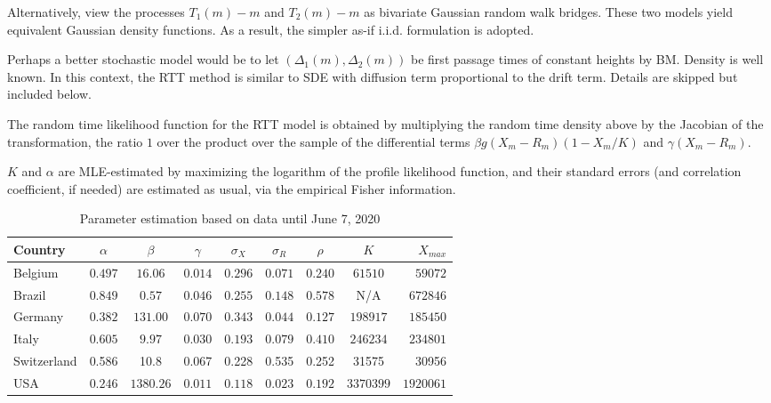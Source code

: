 \documentclass{article}
\begin{document}
\noindent Alternatively, view the processes $T_1(m)-m$ and $T_2(m)-m$ as bivariate Gaussian random walk bridges.
These two models yield equivalent Gaussian density functions. As a result, the simpler as-if i.i.d. formulation is adopted.

\bigskip

\noindent Perhaps a better stochastic model would be to let $(\Delta_1(m),\Delta_2(m))$ be first passage times of constant heights by BM. Density is well known. In this context, the RTT method is similar to SDE with diffusion term proportional to the drift term. Details are skipped but included below.

\bigskip

\noindent The random time likelihood function for the RTT model is obtained by multiplying the random time density above by the Jacobian of the transformation, the ratio $1$ over the product over the sample of the differential terms $\beta g(X_m-R_m)(1-X_m/K)$ and $\gamma (X_m-R_m)$.

\bigskip

\noindent $K$ and $\alpha$ are MLE-estimated by maximizing the logarithm of the profile likelihood function, and their standard errors (and correlation coefficient, if needed) are estimated as usual, via the empirical Fisher information.

\newpage

\begin{table}
\begin{center}
\begin{tabular}{l|ccccccc|r}
Country & $\alpha$ & $\beta$ & $\gamma$ & $\sigma_X $ & $ \sigma_R$ & $\rho$ & $K$ & $X_{max}$ \\ \hline
Belgium & $0.497$ & $16.06$ & $0.014$ & $0.296$ & $0.071$ & $0.240$ & $61510$ & $59072$ \\
Brazil  & $0.849$ & $0.57$ & $0.046$ & $0.255$ & $0.148$ & $0.578$ & N/A & $672846$ \\
Germany & $0.382$ & $131.00$ & $0.070$ & $0.343$ & $0.044$ & $0.127$ & $198917$ & $185450$ \\
Italy  & $0.605$ & $9.97$ & $0.030$ & $0.193$ & $0.079$ & $0.410$ & $246234$ & $234801$ \\
Switzerland & 0.586	 &	10.8 & 0.067 & 0.228  & 0.535 & 0.252 & 31575&      30956	    \\
USA    & $0.246$  & $1380.26$ & $0.011$ & $0.118$ & $0.023$ & $0.192$ & $3370399$ & $1920061$ \\ \hline
\end{tabular}
\caption{
Parameter estimation based on data until June 7, 2020
\label{tablejune7}
}
\end{center}
\end{table}
\end{document}
